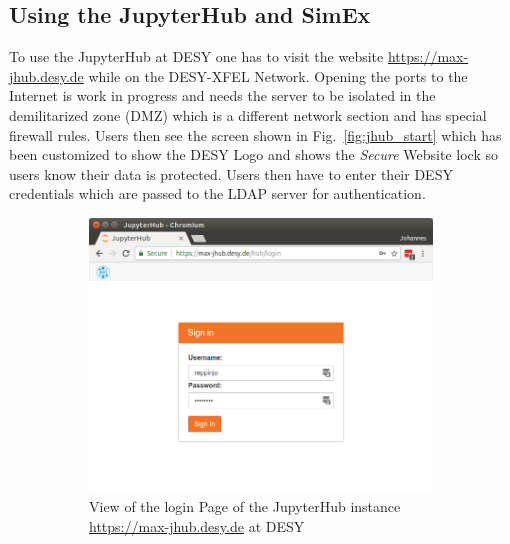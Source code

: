 \documentclass[10pt]{scrartcl}
\begin{document}
\subsection{Using the JupyterHub and SimEx}
To use the JupyterHub at DESY one has to visit the website \url{https://max-jhub.desy.de} while on the DESY-XFEL Network.
Opening the ports to the Internet is work in progress and needs the server to be isolated in the demilitarized zone (DMZ) which is a different network section and has special firewall rules.
Users then see the screen shown in Fig.~\ref{fig:jhub_start} which has been
customized to show the DESY Logo and shows the \textit{Secure} Website lock so
users know their data is protected.
Users then have to enter their DESY credentials which are passed to the LDAP
server for authentication.
%
\begin{figure}
  \centering
  \begin{subfigure}{0.45\textwidth} %
	  \includegraphics[width=\textwidth]{figures/jhub001.png}
	  \caption{View of the login Page of the JupyterHub instance \url{https://max-jhub.desy.de} at DESY} %
  \end{subfigure}
  \vspace{1em} %
  \begin{subfigure}{0.45\textwidth} %

\end{subfigure}
\end{figure}
\end{document}
